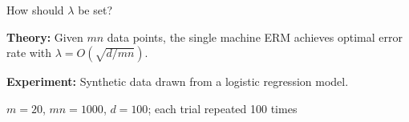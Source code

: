 \begin{frame}[fragile]{How should $\lambda$ be set?}

\textbf{Theory:}
Given $mn$ data points, the single machine ERM achieves optimal error rate with $\lambda=O(\sqrt{d/mn})$.

\vspace{0.15in}

\textbf{Experiment:}
Synthetic data drawn from a logistic regression model.

$m=20$, $mn=1000$, $d=100$; each trial repeated 100 times

\begin{center}
\newcommand{\mklambdaplot}[3]{
\begin{tikzpicture}
    [ yscale=0.8
    ]
#3
\begin{axis}
    [ width=4in
    , height=2.3in
    , xmode=log
    , ymode=log
    , xmin=10^-4
    , xmax=10^4
    , xtick={0.0001,0.01,1,100,10000}
    , xticklabels={$10^{4}$,$10^{2}$,$10^{0}$,$10^{-2}$,$10^{-4}$}
    , enlarge y limits=0
    , x dir=reverse
#2
    ]
\addplot[black,no marks] table [x index=3,y index=5] {#1};
\addplot[wmlei,no marks,thick] table [x index=3,y index=7] {#1};
\addplot[wave,no marks] table [x index=3,y index=9] {#1};
\end{axis}


\end{tikzpicture}}
\end{center}
\end{frame}
